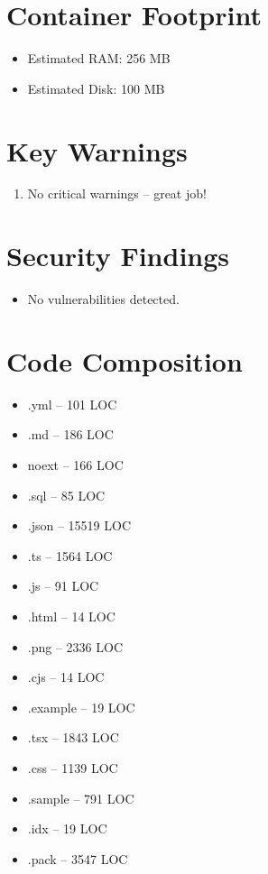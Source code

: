 \documentclass{article}
\begin{document}
\section*{Container Footprint}
\begin{itemize}[leftmargin=*]
  \item Estimated RAM: 256 MB
  \item Estimated Disk: 100 MB
\end{itemize}

\section*{Key Warnings}
\begin{enumerate}[label=\textbullet,leftmargin=*]
    \item No critical warnings – great job!
\end{enumerate}

\section*{Security Findings}
\begin{itemize}[leftmargin=*]
    \item No vulnerabilities detected.
\end{itemize}

\section*{Code Composition}
\begin{itemize}[leftmargin=*]
    \item .yml – 101 LOC
    \item .md – 186 LOC
    \item noext – 166 LOC
    \item .sql – 85 LOC
    \item .json – 15519 LOC
    \item .ts – 1564 LOC
    \item .js – 91 LOC
    \item .html – 14 LOC
    \item .png – 2336 LOC
    \item .cjs – 14 LOC
    \item .example – 19 LOC
    \item .tsx – 1843 LOC
    \item .css – 1139 LOC
    \item .sample – 791 LOC
    \item .idx – 19 LOC
    \item .pack – 3547 LOC
\end{itemize}
\end{document}
